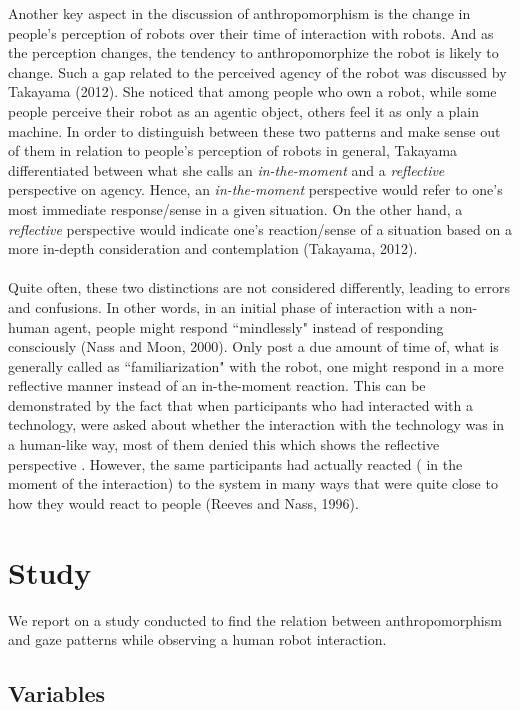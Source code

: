 \documentclass{acm_proc_article-sp}
\begin{document}
Another key aspect in the discussion of anthropomorphism is the change in
people's perception of robots over their time of interaction with robots. And as
the perception changes, the tendency to anthropomorphize the robot is likely to
change. Such a gap related to the perceived agency of the robot was discussed by
Takayama (2012)\cite{c6}. She noticed that among people who own a robot, while
some people perceive their robot as an agentic object, others feel  it as only a
plain machine. In order to distinguish between these two patterns and make sense
out of them in relation to people's perception of robots in general, Takayama
differentiated between what she calls an \textit{in-the-moment} and a
\textit{reflective} perspective on agency. Hence, an \textit{in-the-moment}
perspective would refer to one's most immediate response/sense in a given
situation. On the other hand, a \textit{reflective} perspective would indicate
one's reaction/sense of a situation based on a more in-depth  consideration and
contemplation (Takayama, 2012)\cite{c6}. \\ \\ Quite often, these two
distinctions are not considered differently, leading to errors and confusions.
In other words, in an initial phase of interaction with a non-human agent,
people might respond ``mindlessly" instead of responding consciously (Nass and
Moon, 2000)\cite{c7}. Only post a due amount of time of, what is generally
called as ``familiarization" with the robot, one might respond in a more
reflective manner instead of an in-the-moment reaction. This can be demonstrated
by the fact that when participants who had interacted with a technology, were
asked about whether the interaction with the technology was in a human-like way,
most of them denied this which shows the reflective perspective . However, the
same participants had actually reacted ( in the moment of the interaction) to
the system in many ways that were quite close to how they would react to people
(Reeves and Nass, 1996)\cite{c8}.    

\section{Study}

We report on a study conducted to find the relation between anthropomorphism and
gaze patterns while observing a human robot interaction.

\subsection{Variables}
\end{document}
